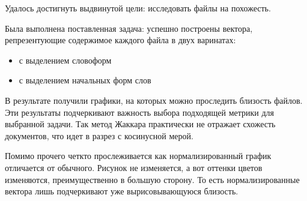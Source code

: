 
Удалось достигнуть выдвинутой цели: исследовать файлы на похожесть.

Была выполнена поставленная задача: успешно построены вектора, репрезентующие содержимое каждого файла в двух варинатах:
\begin{itemize}
    \item с выделением словоформ
    \item с выделением начальных форм слов
\end{itemize}

В результате получили графики, на которых можно проследить близость файлов. Эти результаты подчеркивают важность выбора подходящей метрики для выбранной задачи. 
Так метод Жаккара практически не отражает схожесть документов, что идет в разрез с косинусной мерой.

Помимо прочего четкто прослеживается как нормализированный график отличается от обычного. Рисунок не изменяется, а вот оттенки цветов изменяются, преимущественно в большую сторону.
То есть нормализированные вектора лишь подчеркивают уже вырисовывающуюся близость.